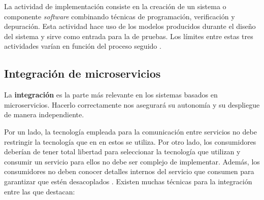 \documentclass[11pt,spanish,listoffigures]{tfgetsinf}
\begin{document}
La actividad de implementación consiste en la creación de un sistema o componente \textit{software} combinando técnicas de programación, verificación y depuración. Esta actividad hace uso de los modelos producidos durante el diseño del sistema y sirve como entrada para la de pruebas. Los límites entre estas tres actividades varían en función del proceso seguido \cite{Bourque2014}.

\subsection{Integración de microservicios} \label{subsect:Integracion}

La \textbf{integración} es la parte más relevante en los sistemas basados en microservicios. Hacerlo correctamente nos asegurará su autonomía y su despliegue de manera independiente.

Por un lado, la tecnología empleada para la comunicación entre servicios no debe restringir la tecnología que en en estos se utiliza. Por otro lado, los consumidores deberían de tener total libertad para seleccionar la tecnología que utilizan y consumir un servicio para ellos no debe ser complejo de implementar. Además, los consumidores no deben conocer detalles internos del servicio que consumen para garantizar que estén desacoplados \cite{Newman2015a}. Existen muchas técnicas para la integración entre las que destacan: 
\end{document}

